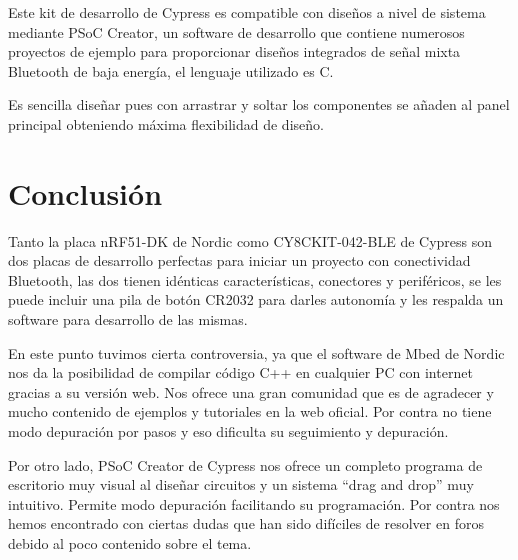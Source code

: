 Este kit de desarrollo de Cypress es compatible con diseños a nivel de sistema mediante PSoC Creator, un software de desarrollo que contiene numerosos proyectos de ejemplo para proporcionar diseños integrados de señal mixta Bluetooth de baja energía, el lenguaje utilizado es C.

Es sencilla diseñar pues con arrastrar y soltar los componentes se añaden al panel principal obteniendo máxima flexibilidad de diseño.

\section{Conclusión}
\label{makereference3.5}

Tanto la placa nRF51-DK de Nordic como CY8CKIT-042-BLE de Cypress son dos placas de desarrollo perfectas para iniciar un proyecto con conectividad Bluetooth, las dos tienen idénticas características, conectores y periféricos, se les puede incluir una pila de botón CR2032 para darles autonomía y les respalda un software para desarrollo de las mismas.

En este punto tuvimos cierta controversia, ya que el software de Mbed de Nordic nos da la posibilidad de compilar código C++ en cualquier PC con internet gracias a su versión web. Nos ofrece una gran comunidad que es de agradecer y mucho contenido de ejemplos y tutoriales en la web oficial. Por contra no tiene modo depuración por pasos y eso dificulta su seguimiento y depuración. 

Por otro lado, PSoC Creator de Cypress nos ofrece un completo programa de escritorio muy visual al diseñar circuitos y un sistema “drag and drop” muy intuitivo. Permite modo depuración facilitando su programación. Por contra nos hemos encontrado con ciertas dudas que han sido difíciles de resolver en foros debido al poco contenido sobre el tema.